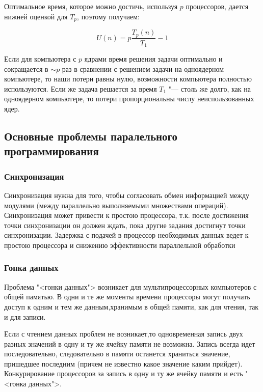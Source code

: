 \documentclass{article}
\begin{document}
				Оптимальное время, которое можно достичь, используя $p$ процессоров, дается нижней оценкой для $T_p$, 							поэтому получаем:	

			\begin{equation}
				\label{eq:loss_of_efficiency_second}
				U(n) = p\frac{T_p(n)}{T_1} - 1
			\end{equation}
				
				Если для компьютера с $p$ ядрами время решения задачи оптимально и сокращается в $\sim p$ раз в сравнении с 					решением задачи на одноядерном компьютере, то наши потери равны нулю, возможности компьютера полностью используются. 				Если же задача решается за время $T_1$ "--- столь же долго, как на одноядерном компьютере, то потери пропорциональны 				числу неиспользованных ядер.
				
		\subsection{Основные проблемы паралельного программирования}
			\subsubsection{Синхронизация}
				Синхронизация нужна для того, чтобы согласовать обмен информацией между модулями (между параллельно выполняемыми 				множествами операций). Синхронизация может привести к простою процессора, т.к. после достижения точки синхронизации 				он должен ждать, пока другие задания достигнут точки синхронизации. Задержка с подачей в процессор необходимых данных 			ведет к простою процессора и снижению эффективности параллельной обработки
			\subsubsection{Гонка данных}
				Проблема "<гонки данных"> возникает для мультипроцессорных компьютеров с общей памятью. В одни и те же моменты 					времени процессоры могут получать доступ к одним и тем же данным,хранимым в общей памяти, как для чтения, так и для 				записи.
				
				Если с чтением данных проблем не возникает,то одновременная запись двух разных значений в одну и ту же ячейку 					памяти не возможна. Запись всегда идет последовательно, следовательно в памяти останется храниться значение, 						пришедшее последним (причем не известно какое значение каким прийдет). Конкурирование процессоров за запись в одну и 				ту же ячейку памяти и есть "<гонка данных">. 
				
\end{document}
